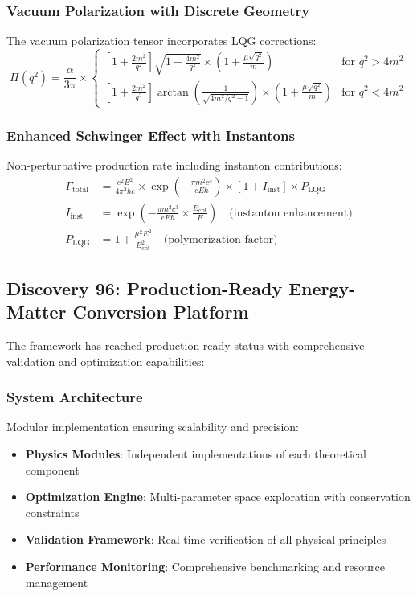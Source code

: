 \documentclass[11pt]{article}
\begin{document}
\subsubsection{Vacuum Polarization with Discrete Geometry}
The vacuum polarization tensor incorporates LQG corrections:
\begin{equation}
\Pi(q^2) = \frac{\alpha}{3\pi} \times \begin{cases}
\left[1 + \frac{2m^2}{q^2}\right]\sqrt{1 - \frac{4m^2}{q^2}} \times \left(1 + \frac{\mu\sqrt{q^2}}{m}\right) & \text{for } q^2 > 4m^2 \\
\left[1 + \frac{2m^2}{q^2}\right]\arctan\left(\frac{1}{\sqrt{4m^2/q^2 - 1}}\right) \times \left(1 + \frac{\mu\sqrt{q^2}}{m}\right) & \text{for } q^2 < 4m^2
\end{cases}
\end{equation}

\subsubsection{Enhanced Schwinger Effect with Instantons}
Non-perturbative production rate including instanton contributions:
\begin{align}
\Gamma_{\text{total}} &= \frac{e^2E^2}{4\pi^3\hbar c} \times \exp\left(-\frac{\pi m^2c^3}{eE\hbar}\right) \times [1 + I_{\text{inst}}] \times P_{\text{LQG}} \\
I_{\text{inst}} &= \exp\left(-\frac{\pi m^2c^3}{eE\hbar} \times \frac{E_{\text{crit}}}{E}\right) \quad \text{(instanton enhancement)} \\
P_{\text{LQG}} &= 1 + \frac{\mu^2E^2}{E_{\text{crit}}^2} \quad \text{(polymerization factor)}
\end{align}

\subsection{Discovery 96: Production-Ready Energy-Matter Conversion Platform}

The framework has reached production-ready status with comprehensive validation and optimization capabilities:

\subsubsection{System Architecture}
Modular implementation ensuring scalability and precision:
\begin{itemize}
\item \textbf{Physics Modules}: Independent implementations of each theoretical component
\item \textbf{Optimization Engine}: Multi-parameter space exploration with conservation constraints
\item \textbf{Validation Framework}: Real-time verification of all physical principles
\item \textbf{Performance Monitoring}: Comprehensive benchmarking and resource management
\end{itemize}
\end{document}
